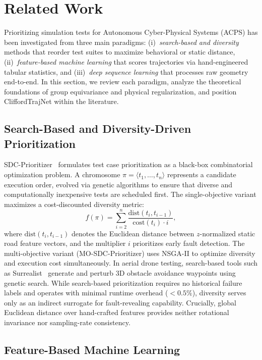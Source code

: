 \section{Related Work}
\label{sec:related}

Prioritizing simulation tests for Autonomous Cyber-Physical Systems (ACPS) has been investigated from three main paradigms: (i)~\emph{search-based and diversity} methods that reorder test suites to maximize behavioral or static distance, (ii)~\emph{feature-based machine learning} that scores trajectories via hand-engineered tabular statistics, and (iii)~\emph{deep sequence learning} that processes raw geometry end-to-end. 
In this section, we review each paradigm, analyze the theoretical foundations of group equivariance and physical regularization, and position CliffordTrajNet within the literature.

\subsection{Search-Based and Diversity-Driven Prioritization}

SDC-Prioritizer~\cite{sdcprio} formulates test case prioritization as a black-box combinatorial optimization problem.
A chromosome $\pi = \langle t_1, \dots, t_n \rangle$ represents a candidate execution order, evolved via genetic algorithms to ensure that diverse and computationally inexpensive tests are scheduled first.
The single-objective variant maximizes a cost-discounted diversity metric:
\begin{equation}
f(\pi) = \sum_{i=2}^{n} \frac{\mathrm{dist}(t_i, t_{i-1})}{\mathrm{cost}(t_i) \cdot i},
\end{equation}
where $\mathrm{dist}(t_i, t_{i-1})$ denotes the Euclidean distance between $z$-normalized static road feature vectors, and the multiplier $i$ prioritizes early fault detection.
The multi-objective variant (MO-SDC-Prioritizer) uses NSGA-II to optimize diversity and execution cost simultaneously.
In aerial drone testing, search-based tools such as Surrealist~\cite{roadfury} generate and perturb 3D obstacle avoidance waypoints using genetic search.
While search-based prioritization requires no historical failure labels and operates with minimal runtime overhead ($<0.5\%$), diversity serves only as an indirect surrogate for fault-revealing capability.
Crucially, global Euclidean distance over hand-crafted features provides neither rotational invariance nor sampling-rate consistency.

\subsection{Feature-Based Machine Learning}

